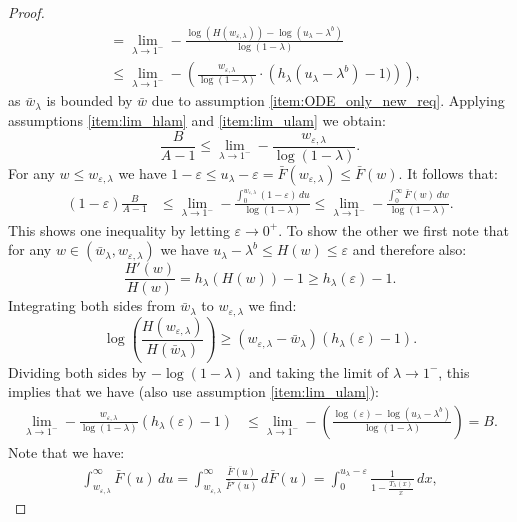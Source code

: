 \documentclass[12pt]{report}
\begin{document}
\begin{proof}
\begin{align*}
&= \lim_{\lambda \rightarrow 1^-} - \frac{\log(H(w_{\varepsilon,\lambda}))-\log(u_{\lambda}-\lambda^b)}{\log(1-\lambda)}\\
& \leq \lim_{\lambda \rightarrow 1^-} -\left(
\frac{w_{\varepsilon,\lambda}}{\log(1-\lambda)} \cdot \left( h_{\lambda}(u_{\lambda}-\lambda^b) - 1) \right)
\right),
\end{align*}
as $\bar w_\lambda$ is bounded by $\bar w$ due to assumption \ref{item:ODE_only_new_req}.
Applying assumptions \ref{item:lim_hlam} and \ref{item:lim_ulam} we obtain:
$$
\frac{B}{A-1} \leq  \lim_{\lambda \rightarrow 1^-} -\frac{w_{\varepsilon,\lambda}}{\log(1-\lambda)}.
$$
For any $w \leq w_{\varepsilon, \lambda}$ we have $1-\varepsilon \leq u_{\lambda} - \varepsilon 
= \bar F(w_{\varepsilon, \lambda}) \leq \bar F(w)$. It follows that:
\begin{align*}
(1-\varepsilon) \frac{B}{A-1}
&\leq \lim_{\lambda \rightarrow 1^-} - \frac{\int_{0}^{w_{\varepsilon,\lambda}} (1-\varepsilon) \, du}{\log(1-\lambda)} \leq \lim_{\lambda \rightarrow 1^-} - \frac{\int_0^\infty \bar F(w)\, dw}{\log(1-\lambda)}.
\end{align*}
This shows one inequality by letting $\varepsilon\rightarrow 0^+$. To show the other we first note that for any $w \in (\bar w_{\lambda}, w_{\varepsilon, \lambda})$ we have 
$u_\lambda-\lambda^b \leq H(w) \leq \varepsilon$ and therefore also:
$$
\frac{H'(w)}{H(w)}
=
h_{\lambda}(H(w)) - 1
\geq
h_{\lambda}(\varepsilon) - 1.
$$
Integrating both sides from $\bar w_\lambda$ to $w_{\varepsilon,\lambda}$ we find:
$$
\log \left( \frac{H(w_{\varepsilon,\lambda})}{H(\bar w_{\lambda})} \right) \geq (w_{\varepsilon, \lambda} - \bar w_{\lambda}) (h_\lambda(\varepsilon) - 1).
$$
Dividing both sides by $-\log(1-\lambda)$ and taking the limit of $\lambda \rightarrow 1^-$, this implies that we have (also use assumption \ref{item:lim_ulam}):
\begin{align*}
\lim_{\lambda \rightarrow 1^-} - \frac{w_{\varepsilon,\lambda}}{\log(1-\lambda)} (h_\lambda(\varepsilon) - 1)
&\leq \lim_{\lambda \rightarrow 1^-} - 
\left( \frac{\log(\varepsilon) - \log(u_{\lambda} - \lambda^b)}{\log(1-\lambda)} \right)=B.
\end{align*}
Note that we have:
\begin{align}
\int_{w_{\varepsilon, \lambda}}^\infty \bar F(u) \, du = \int_{w_{\varepsilon, \lambda}}^\infty \frac{\bar F(u)}{\bar F'(u)} \, d\bar F(u) = \int_0^{u_{\lambda} - \varepsilon} \frac{1}{1-\frac{T_\lambda(x)}{x} } \, dx, \label{eq:int_end_ODE}
\end{align}

\end{proof}
\end{document}

